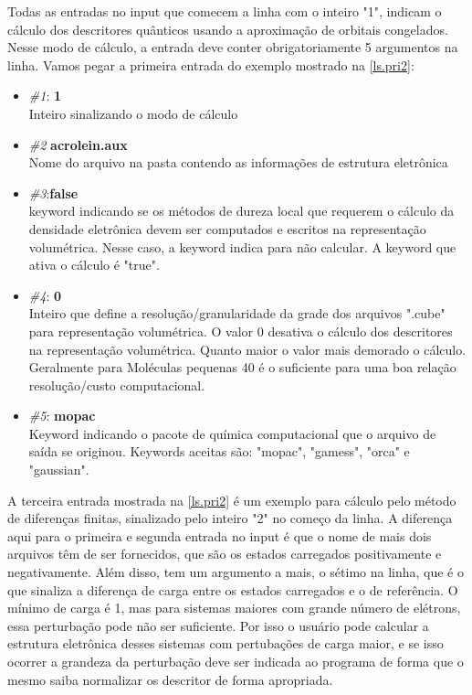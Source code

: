 \documentclass[a4paper,11pt]{refart}
\begin{document}
Todas as entradas no input que comecem a linha com o inteiro "1", indicam o cálculo dos descritores quânticos usando a aproximação de orbitais congelados. Nesse modo de cálculo, a entrada deve conter obrigatoriamente 5 argumentos na linha. Vamos pegar a primeira entrada do exemplo mostrado na \autoref{ls.pri2}:


\begin{itemize}
	\item \emph{\#1}: \textbf{1}\\
	Inteiro sinalizando o modo de cálculo
	\item \emph{\#2} \textbf{acrolein.aux}\\
	Nome do arquivo na pasta contendo as informações de estrutura eletrônica
	\item \emph{\#3}:\textbf{false} \\
	keyword indicando se os métodos de dureza local que requerem o cálculo da densidade eletrônica devem ser computados e escritos na representação volumétrica. Nesse caso, a keyword indica para não calcular. A keyword que ativa o cálculo é "true". 
	\item \emph{\#4}: \textbf{0}\\
	Inteiro que define a resolução/granularidade da grade dos arquivos ".cube" para representação volumétrica. O valor 0 desativa o cálculo dos descritores na representação volumétrica. Quanto maior o valor mais demorado o cálculo. Geralmente para Moléculas pequenas 40 é o suficiente para uma boa relação resolução/custo computacional. 
	\item \emph{\#5}: \textbf{mopac}\\
	Keyword indicando o pacote de química computacional que o arquivo de saída se originou. 
	Keywords aceitas são: "mopac", "gamess", "orca" e "gaussian".	
\end{itemize}

A terceira entrada mostrada na \autoref{ls.pri2} é um exemplo para cálculo pelo método de diferenças finitas, sinalizado pelo inteiro "2" no começo da linha. A diferença aqui para o primeira e segunda entrada no input é que o nome de mais dois arquivos têm de ser fornecidos, que são os estados carregados positivamente e negativamente. Além disso, tem um argumento a mais, o sétimo na linha, que é o que sinaliza a diferença de carga entre os estados carregados e o de referência. O mínimo de carga é 1, mas para sistemas maiores com grande número de elétrons, essa perturbação pode não ser suficiente. Por isso o usuário pode calcular a estrutura eletrônica desses sistemas com pertubações de carga maior, e se isso ocorrer a grandeza da perturbação deve ser indicada ao programa de forma que o mesmo saiba normalizar os descritor de forma apropriada. 
\end{document}
